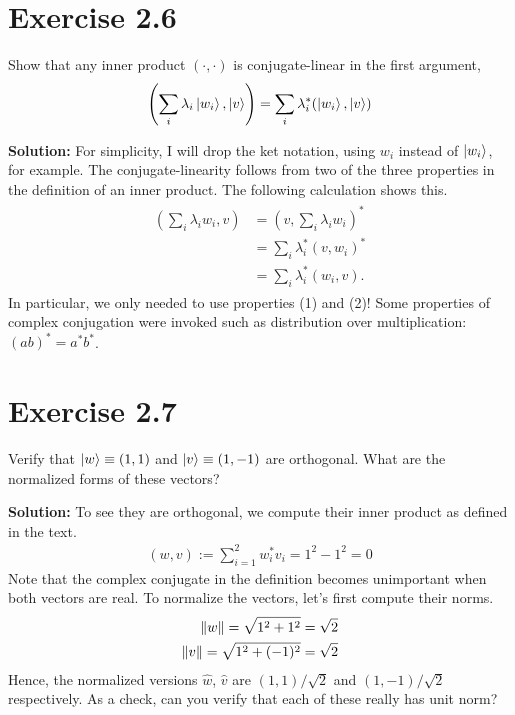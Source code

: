 \documentclass{book}
\begin{document}
\section*{Exercise 2.6}
    Show that any inner product $(\cdot, \cdot)$ is conjugate-linear in the first argument,
    \begin{align}
        \left(\sum_i \lambda_i \ket{w_i}, \ket{v}\right) = \sum_i \lambda_i^* (\ket{w_i}, \ket{v})
    \end{align}
    
    \textbf{Solution:} For simplicity, I will drop the ket notation, using $w_i$ instead of $\ket{w_i}$, for example. The conjugate-linearity follows from two of the three properties in the definition of an inner product. The following calculation shows this.
    \begin{align}
    \begin{aligned}
        \left(\sum_i \lambda_i w_i, v\right) &= \left(v, \sum_i \lambda_i w_i\right)^* \\
        &= \sum_i \lambda_i^* (v, w_i)^* \\
        &= \sum_i \lambda_i^* (w_i, v).
    \end{aligned}
    \end{align}
    In particular, we only needed to use properties (1) and (2)! Some properties of complex conjugation were invoked such as distribution over multiplication: $(ab)^* = a^* b^*$.
    
\section*{Exercise 2.7}
    Verify that $\ket{w} \equiv (1, 1)$ and $\ket{v} \equiv (1, -1)$ are orthogonal. What are the normalized forms of these vectors?
    
    \textbf{Solution:} To see they are orthogonal, we compute their inner product as defined in the text.
    \begin{align}
        (w,v) := \sum_{i=1}^2 w_i^* v_i = 1^2 - 1^2 = 0
    \end{align}
    Note that the complex conjugate in the definition becomes unimportant when both vectors are real. To normalize the vectors, let's first compute their norms.
    \begin{align}
        \norm{w} = \sqrt{1^2 + 1^2} = \sqrt{2} \\
        \norm{v} = \sqrt{1^2 + (-1)^2} = \sqrt{2}
    \end{align}
    Hence, the normalized versions $\hat{w}$, $\hat{v}$ are $(1,1)/\sqrt{2}$ and $(1,-1)/\sqrt{2}$ respectively. As a check, can you verify that each of these really has unit norm?
    
\end{document}
